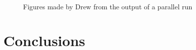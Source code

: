\documentclass[12pt, notitlepage]{article}
\begin{document}
\begin{figure}[ht]
\centering
{}
\caption{Figures made by Drew from the output of a parallel run} \label{fig:drewgraphs}
\end{figure}



\section{Conclusions}
\end{document}
